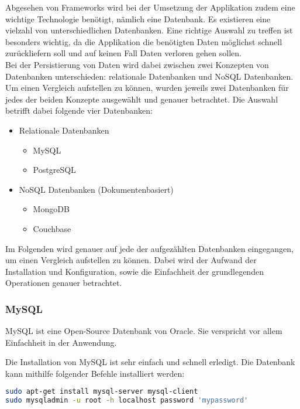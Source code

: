 
Abgesehen von Frameworks wird bei der Umsetzung der Applikation zudem eine wichtige Technologie benötigt, nämlich eine Datenbank. Es existieren eine vielzahl von unterschiedlichen Datenbanken. Eine richtige Auswahl zu treffen ist besonders wichtig, da die Applikation die benötigten Daten möglichst schnell zurückliefern soll und auf keinen Fall Daten verloren gehen sollen. \\
Bei der Persistierung von Daten wird dabei zwischen zwei Konzepten von Datenbanken unterschieden: relationale Datenbanken und NoSQL Datenbanken. Um einen Vergleich aufstellen zu können, wurden jeweils zwei Datenbanken für jedes der beiden Konzepte ausgewählt und genauer betrachtet. Die Auswahl betrifft dabei folgende vier Datenbanken:\\
\begin{itemize}
\item Relationale Datenbanken
\begin{itemize}
\item MySQL
\item PostgreSQL
\end{itemize}
\item NoSQL Datenbanken (Dokumentenbasiert)
\begin{itemize}
\item MongoDB
\item Couchbase
\end{itemize}
\end{itemize}

Im Folgenden wird genauer auf jede der aufgezählten Datenbanken eingegangen, um einen Vergleich aufstellen zu können. Dabei wird der Aufwand der Installation und Konfiguration, sowie die Einfachheit der grundlegenden Operationen genauer betrachtet.

\subsubsection{MySQL}
\label{subsubsec:mysql}
MySQL ist eine Open-Source Datenbank von Oracle. Sie verspricht vor allem Einfachheit in der Anwendung.\cite{ABOUTMYSQL}

Die Installation von MySQL ist sehr einfach und schnell erledigt. Die Datenbank kann mithilfe folgender Befehle installiert werden:
\begin{lstlisting}[caption=Installation von MySQL \cite{MYSQLINSTALL}, language=bash]
sudo apt-get install mysql-server mysql-client
sudo mysqladmin -u root -h localhost password 'mypassword'
\end{lstlisting}

